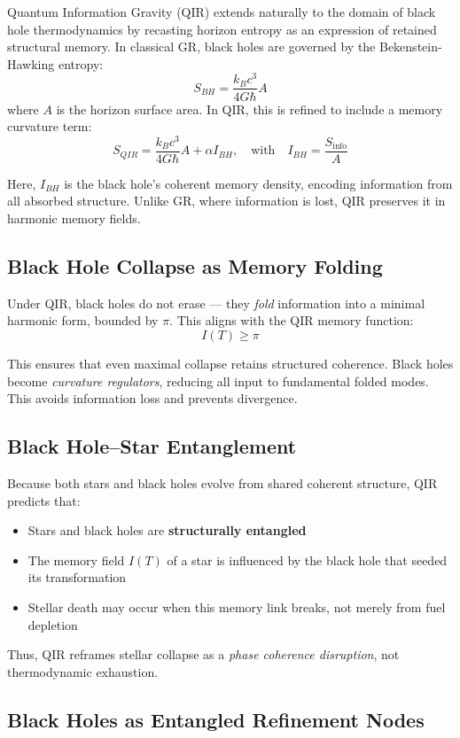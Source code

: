 \documentclass[11pt]{article}
\begin{document}
Quantum Information Gravity (QIR) extends naturally to the domain of black hole thermodynamics by recasting horizon entropy as an expression of retained structural memory. In classical GR, black holes are governed by the Bekenstein-Hawking entropy:
\[
S_{BH} = \frac{k_B c^3}{4G \hbar} A
\]
where \( A \) is the horizon surface area. In QIR, this is refined to include a memory curvature term:
\[
S_{QIR} = \frac{k_B c^3}{4G \hbar} A + \alpha I_{BH}, \quad \text{with} \quad I_{BH} = \frac{S_{\text{info}}}{A}
\]

Here, \( I_{BH} \) is the black hole's coherent memory density, encoding information from all absorbed structure. Unlike GR, where information is lost, QIR preserves it in harmonic memory fields.

\subsection*{Black Hole Collapse as Memory Folding}

Under QIR, black holes do not erase — they \textit{fold} information into a minimal harmonic form, bounded by \( \pi \). This aligns with the QIR memory function:
\[
I(T) \geq \pi
\]

This ensures that even maximal collapse retains structured coherence. Black holes become \textit{curvature regulators}, reducing all input to fundamental folded modes. This avoids information loss and prevents divergence.


\subsection*{Black Hole–Star Entanglement}

Because both stars and black holes evolve from shared coherent structure, QIR predicts that:
\begin{itemize}
  \item Stars and black holes are \textbf{structurally entangled}
  \item The memory field \( I(T) \) of a star is influenced by the black hole that seeded its transformation
  \item Stellar death may occur when this memory link breaks, not merely from fuel depletion
\end{itemize}

Thus, QIR reframes stellar collapse as a \textit{phase coherence disruption}, not thermodynamic exhaustion.


\subsection*{Black Holes as Entangled Refinement Nodes}
\end{document}
